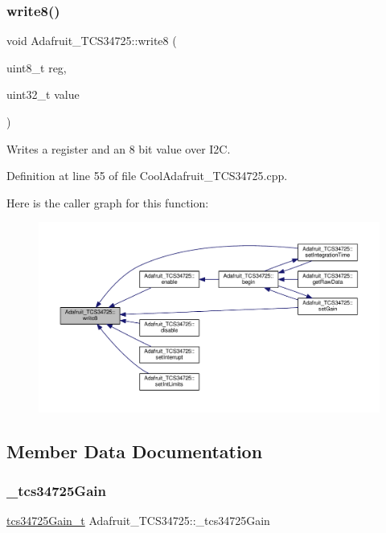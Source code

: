 \subsubsection{\texorpdfstring{write8()}{write8()}}
{\footnotesize\ttfamily void Adafruit\+\_\+\+T\+C\+S34725\+::write8 (\begin{DoxyParamCaption}\item[{uint8\+\_\+t}]{reg,  }\item[{uint32\+\_\+t}]{value }\end{DoxyParamCaption})}



Writes a register and an 8 bit value over I2C. 



Definition at line 55 of file Cool\+Adafruit\+\_\+\+T\+C\+S34725.\+cpp.

Here is the caller graph for this function\+:
\nopagebreak
\begin{figure}[H]
\begin{center}
\leavevmode
\includegraphics[width=350pt]{class_adafruit___t_c_s34725_aa526557ad0d76b3b6e31e6197de583e6_icgraph}
\end{center}
\end{figure}


\subsection{Member Data Documentation}
\mbox{\label{class_adafruit___t_c_s34725_ae614cd13b99a10b8e05ec78cab05c700}} 
\subsubsection{\texorpdfstring{\+\_\+tcs34725\+Gain}{\_tcs34725Gain}}
{\footnotesize\ttfamily \hyperlink{_cool_adafruit___t_c_s34725_8h_a23611ba111ac38012551332ee7189f9a}{tcs34725\+Gain\+\_\+t} Adafruit\+\_\+\+T\+C\+S34725\+::\+\_\+tcs34725\+Gain\hspace{0.3cm}{\ttfamily [private]}}



